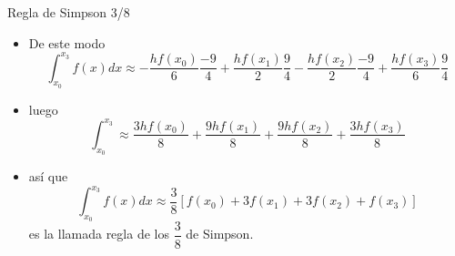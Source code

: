 \documentclass[12pt]{beamer}
\begin{document}
\begin{frame}{Regla de Simpson 3/8}
  \begin{itemize}
    \item De este modo
    $$
    \int_{x_0}^{x_3}f(x)dx \approx -\dfrac{hf(x_0)}{6}\dfrac{-9}{4} + \dfrac{hf(x_1)}{2}\dfrac{9}{4} - \dfrac{hf(x_2)}{2}\dfrac{-9}{4} + \dfrac{hf(x_3)}{6}\dfrac{9}{4}
    $$
    \item<2->luego
    $$
    \int_{x_0}^{x_3} \approx \dfrac{3hf(x_0)}{8} + \dfrac{9hf(x_1)}{8} + \dfrac{9hf(x_2)}{8} + \dfrac{3hf(x_3)}{8}
    $$
    \item<3-> as\'i que 
    $$
    \int_{x_0}^{x_3}f(x)dx \approx \dfrac{3}{8}\left[f(x_0)+3f(x_1)+3f(x_2)+f(x_3)\right]
    $$
    es la llamada regla de los $\dfrac{3}{8}$ de Simpson.
  \end{itemize}
\end{frame}
\end{document}
